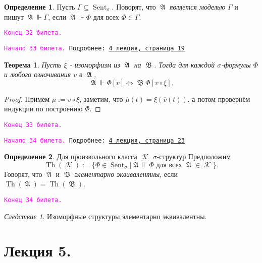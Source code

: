 \documentclass[a4paper,100pt]{article}
\theoremstyle{indented}
\newtheorem{theorem}{Теорема}
\theoremstyle{definition}
\newtheorem{defn}{Определение}
\theoremstyle{remark}
\newtheorem{cons}{Следствие}
\DeclareMathOperator{\Llra}{\Longleftrightarrow}
\DeclareMathOperator{\KK}{\mathscr{K}}
\DeclareMathOperator{\Sent}{Sent}
\DeclareMathOperator{\Th}{Th}
\DeclareMathOperator{\GA}{\mathfrak{A}}
\DeclareMathOperator{\GB}{\mathfrak{B}}
\begin{document}
\begin{defn}
  Пусть $\Gamma \subseteq \Sent_\sigma$. Поворят, что $\GA$ \textit{является моделью} $\Gamma$ и пишут $\GA \Vdash \Gamma$, если $\GA \Vdash \Phi$ для всех $\Phi\in \Gamma$. 
\end{defn}

\texttt{\textcolor{magenta}{Конец 32 билета.}} 

\hrulefill

\texttt{\hypertarget{b33}{\textcolor{magenta}{Начало 33 билета.}} Подробнее: \href{http://www.mi-ras.ru/~speranski/courses/logic-1-2021-spring/slides_4.pdf}{4 лекция, страница 19}} \\

\begin{theorem}
  Пусть $\xi$ - изоморфизм из $\GA$ на $\GB$. Тогда для каждой $\sigma$-формулы $\Phi$ и любого означивания $v$ в $\GA$, 
  \[
    \GA \Vdash \Phi[v] \Llra \GB \Phi[v\circ \xi]. 
  \]
\end{theorem}

\begin{proof}
  Примем $\mu:=v\circ \xi$, заметим, что $\overline{\mu}(t) = \xi (\overline{v}(t))$, а потом провернём индукции по построению $\Phi$. 
\end{proof}

\texttt{\textcolor{magenta}{Конец 33 билета.}} 

\hrulefill

\texttt{\hypertarget{b34}{\textcolor{magenta}{Начало 34 билета.}} Подробнее: \href{http://www.mi-ras.ru/~speranski/courses/logic-1-2021-spring/slides_4.pdf}{4 лекция, страница 23}} \\

\begin{defn}
  Для произвольного класса $\KK$ $\sigma$-структур Предположим
  \[
    \Th(\KK):=\{\Phi\in \Sent_\sigma |\GA \Vdash \Phi \text{ для всех }\GA \in \KK\}.
  \]
  Говорят, что $\GA$ и $\GB$ \textit{элементарно эквивалентны}, если $\Th(\GA)=\Th(\GB)$. 
\end{defn}

\texttt{\textcolor{magenta}{Конец 34 билета.}} 

\hrulefill

\begin{cons}
  Изоморфные структуры элементарно эквивалентны.
\end{cons}

\section{Лекция 5.}
\end{document}
